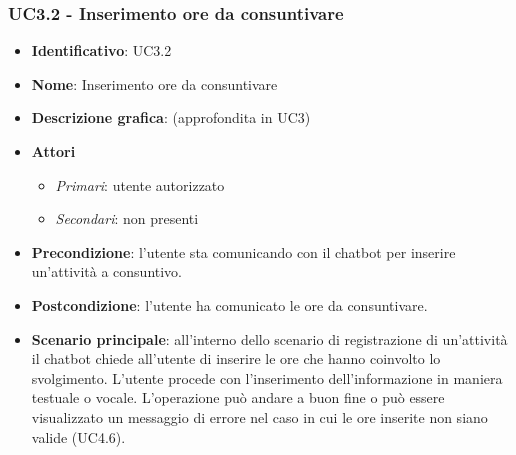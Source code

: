 \subsubsection{UC3.2 - Inserimento ore da consuntivare}
\begin{itemize}
    \item \textbf{Identificativo}: UC3.2 
    \item \textbf{Nome}: Inserimento ore da consuntivare  
    \item \textbf{Descrizione grafica}: (approfondita in UC3)
    \item \textbf{Attori}
        \begin{itemize} 
            \item \textit{Primari}: utente autorizzato
            \item \textit{Secondari}: non presenti
        \end{itemize}
    \item \textbf{Precondizione}: l'utente sta comunicando con il chatbot per inserire un'attività a consuntivo. 
    \item \textbf{Postcondizione}: l'utente ha comunicato le ore da consuntivare. 
    \item \textbf{Scenario principale}: all'interno dello scenario di registrazione di un'attività il chatbot chiede all'utente di inserire le ore che hanno coinvolto lo svolgimento. L'utente procede con l'inserimento dell'informazione in maniera testuale o vocale. L'operazione può andare a buon fine o può essere visualizzato un messaggio di errore nel caso in cui le ore inserite non siano valide (UC4.6).
\end{itemize}
\newpage

